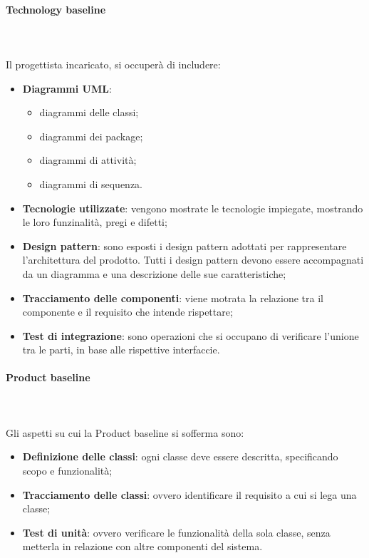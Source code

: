 			\paragraph{Technology baseline} \mbox{} \\ \mbox{} \\
			Il progettista incaricato, si occuperà di includere:
			\begin{itemize}
				\item \textbf{Diagrammi UML}:
				\begin{itemize}
					\item diagrammi delle classi;
					\item diagrammi dei package;
					\item diagrammi di attività;
					\item diagrammi di sequenza.
				\end{itemize}
				\item \textbf{Tecnologie utilizzate}: vengono mostrate le tecnologie impiegate, mostrando le loro funzinalità, pregi e difetti;
				\item \textbf{Design pattern}\glo : sono esposti i design pattern adottati per rappresentare l'architettura del prodotto. Tutti i design pattern devono essere accompagnati da un diagramma e una descrizione delle sue caratteristiche;
				\item \textbf{Tracciamento delle componenti}: viene motrata la relazione tra il componente e il requisito che intende rispettare; 
				\item \textbf{Test di integrazione}: sono operazioni che si occupano di verificare l'unione tra le parti, in base alle rispettive interfaccie.
			\end{itemize}
			\paragraph{Product baseline} \mbox{} \\ \mbox{} \\
			Gli aspetti su cui la  Product baseline si sofferma sono:
				\begin{itemize}
					\item \textbf{Definizione delle classi}: ogni classe deve essere descritta, specificando scopo e funzionalità;
					\item \textbf{Tracciamento delle classi}: ovvero identificare il requisito a cui si lega una classe;
					\item \textbf{Test di unità}: ovvero verificare le funzionalità della sola classe, senza metterla in relazione con altre componenti del sistema.
				\end{itemize}
